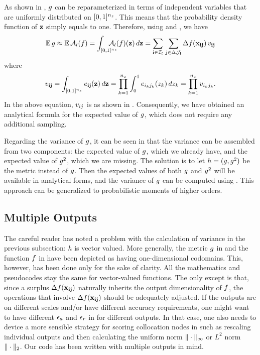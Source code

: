 As shown in , $g$ can be reparameterized in terms of
independent variables that are uniformly distributed on $[0, 1]^{n_z}$. This means
that the probability density function of $\mathbf{z}$ simply equals to one. Therefore,
using  and , we have
\[
  \mathbb{E} \, g \approx \mathbb{E} \, \mathcal{A}_{l}(f) = \int_{[0, 1]^{n_z}} \hspace{-1.5em} \mathcal{A}_{l}(f)(\mathbf{z}) \, d\mathbf{z} = \sum_{\mathbf{i} \in \mathcal{I}_l} \, \sum_{\mathbf{j} \in \Delta\mathcal{J}_{\mathbf{i}}} \Delta f(\mathbf{x}_{\mathbf{i}\mathbf{j}}) \, v_{\mathbf{i}\mathbf{j}}
\]
where
\[
  v_{\mathbf{i}\mathbf{j}} = \int_{[0, 1]^{n_z}} e_{\mathbf{i}\mathbf{j}}(\mathbf{z}) \, d\mathbf{z} = \prod_{k = 1}^{{n_z}} \int_0^1 e_{i_k j_k}(z_k) \, dz_k = \prod_{k = 1}^{{n_z}} v_{i_k j_k}.
\]
In the above equation, $v_{ij}$ is as shown in . Consequently, we
have obtained an analytical formula for the expected value of $g$, which does
not require any additional sampling.

Regarding the variance of $g$, it can be seen in  that the
variance can be assembled from two components: the expected value of $g$, which
we already have, and the expected value of $g^2$, which we are missing. The
solution is to let $h = (g, g^2)$ be the metric instead of $g$. Then the
expected values of both $g$ and $g^2$ will be available in analytical forms,
and the variance of $g$ can be computed using . This approach
can be generalized to probabilistic moments of higher orders.

\subsection{Multiple Outputs}
The careful reader has noted a problem with the calculation of variance in the
previous subsection: $h$ is vector valued. More generally, the metric $g$ in
 and the function $f$ in  have been depicted
as having one-dimensional codomains. This, however, has been done only for the
sake of clarity. All the mathematics and pseudocodes stay the same for
vector-valued functions. The only except is that, since a surplus
$\Delta f(\mathbf{x}_{\mathbf{i}\mathbf{j}})$ naturally inherits the output dimensionality of $f$,
the operations that involve $\Delta f(\mathbf{x}_{\mathbf{i}\mathbf{j}})$ should be adequately
adjusted. If the outputs are on different scales and/or have different accuracy
requirements, one might want to have different $\epsilon_a$ and $\epsilon_r$ in
 for different outputs. In that case, one also needs to
device a more sensible strategy for scoring collocation nodes in 
such as rescaling individual outputs and then calculating the uniform norm
$\| \cdot \|_\infty$ or $L^2$ norm $\| \cdot \|_2$. Our code \cite{sources}
has been written with multiple outputs in mind.

